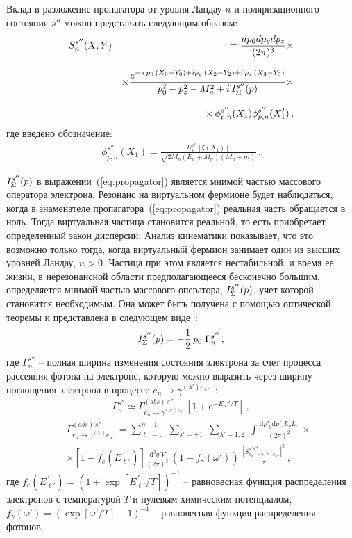 \documentclass[cp1251%
               ]{jetp} %
\def\beq{\begin{eqnarray}}
\def\eeq{\end{eqnarray}}
\newcommand{\ii}{\mathrm{i}} %
\newcommand{\dd}{\mathrm{d}} %
\newcommand{\eee}{\mathrm{e}} %
\begin{document}
Вклад в разложение пропагатора от уровня Ландау $n$ и поляризационного состояния $s''$ можно представить следующим образом:
%
\begin{eqnarray}
\label{eq:propagator}
S^{s''}_n (X, Y) && =  \int \frac{\dd p_0 \dd p_y \dd p_z}{(2\pi)^3} \times
\\[3mm]
\nonumber
&& \times \frac{\eee^{- \, \ii \,  p_0 \,(X_0 - Y_0) + 
		\ii p_y \,(X_2 - Y_2) +  \ii \,  p_z \,(X_3 - Y_3)}}
{p_0^2 - p_z^2 - M_n^2 + \ii\, {\cal I}^{s''}_\Sigma (p)} \times
\\[3mm]
\nonumber
&& \times
\, \phi^{s''}_{p, n} (X_1) \bar \phi^{s''}_{p, n} (X'_1) \, ,
\end{eqnarray}
%
\noindent где введено обозначение:
%
\begin{eqnarray}
\phi^{s''}_{p, n} (X_1) =   \frac{U^{s''}_{n} [\xi(X_1)]}
{\sqrt{2 M_n (E_{n} + M_n)(M_n + m)}} \, .
\label{eq:phi_psi}
\end{eqnarray}

${\cal I}^{s''}_\Sigma (p)$ в выражении~(\ref{eq:propagator}) является мнимой частью массового оператора электрона. Резонанс на виртуальном фермионе будет наблюдаться, когда в знаменателе пропагатора~(\ref{eq:propagator}) реальная часть обращается в ноль. Тогда виртуальная частица становится реальной, то есть приобретает определенный закон дисперсии. Анализ кинематики показывает, что это возможно только тогда, когда виртуальный фермион занимает один из высших уровней Ландау, $n > 0$. Частица при этом является нестабильной, и время ее жизни, в нерезонансной области предполагающееся бесконечно большим, определяется мнимой частью массового оператора,  ${\cal I}^{s''}_\Sigma (p)$, учет которой становится необходимым. Она может быть получена с помощью оптической теоремы и представлена в следующем виде~\cite{Weldon:1982, Zhukovski:1994}:
%
\begin{eqnarray}
{\cal I}^{s''}_\Sigma (p) = - \frac{1}{2}\, p_0 \; \Gamma_n^{s''} \, ,
\label{eq:I_Sigma}
\end{eqnarray}
\noindent где $\Gamma_n^{s''}$ -- полная ширина изменения состояния электрона
за счет процесса рассеяния фотона на электроне, 
которую можно выразить через ширину поглощения электрона в процессе $e_n \to \gamma^{(\lambda')
e_{\ell'} }$~\cite{Weldon:1983}:
\begin{eqnarray}
	\label{Gns}
	\Gamma_n^{s''} \simeq 
	\Gamma^{(abs) \, s''}_{e_n  \to \gamma^{(\lambda') e_{\ell'}}} 
	\left [1+ \eee^{-E_n''/T} \right ]\, ,
\end{eqnarray}
%
\beq
\label{eq:e_abs}
&&\Gamma^{(abs) \, s''}_{e_n \to \gamma^{(\lambda')} e_{\ell'}}  = \sum\limits_{\ell' = 
	0}^{n-1} \;  \sum\limits_{s' = \pm 1} \; \sum\limits_{\lambda' = 1, 2} \; 
\int \frac{\dd p'_y \dd p'_z  L_y L_z }{(2\pi)^2} \, \times 
\\
\nonumber
&&\times [1 - f_{e}(E^{\, 
	\prime}_{\ell'})] \frac{\dd^3 q' V}{(2\pi)^3} \, (1 + f_\gamma(\omega')) \;
\frac{|S^{s^{\,\prime} s''}_{ e_n \to \gamma^{(\lambda')} e_{\ell'}}|^2}{\tau}\, ,
\eeq 
где $f_{e}(E^{\, 	\prime}_{\ell'})=(1+\exp [E^{\, \prime}_{\ell'}/T])^{-1}$ -- равновесная функция распределения электронов с 
температурой $T$ и нулевым химическим потенциалом, $f_\gamma(\omega')=(\exp [\omega'/T]-1)^{-1}$ -- равновесная функция распределения фотонов.
\end{document}
